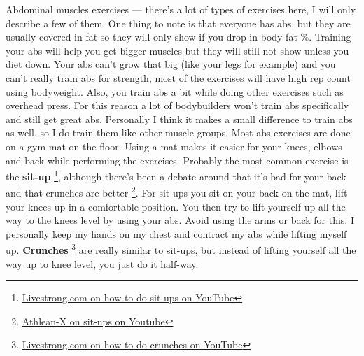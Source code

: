 \documentclass[openany, 12pt]{book}
\begin{document}
        Abdominal muscles exercises
        ---
        there's a lot of types of exercises here, I will only describe a few of them. One thing to note is that everyone has abs, but they are usually covered in fat so they will only show if you drop
        in body fat \%. Training your abs will help you get bigger muscles but they will still not show unless you diet down.
        Your abs can't grow that big (like your legs for example) and you can't really train abs for strength, most of the exercises will have high rep count using bodyweight.
        Also, you train abs a bit while doing other exercises such as overhead press. For this reason a lot of bodybuilders won't train abs specifically and still get great abs.
        Personally I think it makes a small difference to train abs as well, so I do train them like other muscle groups.
        Most abs exercises are done on a gym mat on the floor. Using a mat makes it easier for your knees, elbows and back while performing the exercises.
        Probably the most common exercise is the \textbf{sit-up}
        \footnote{\href{https://www.youtube.com/watch?v=1fbU_MkV7NE}{Livestrong.com on how to do sit-ups on YouTube}}, although there's been a debate around that it's bad for your back and
        that crunches are better
        \footnote{\href{https://www.youtube.com/watch?v=y5BpvYGyVb0}{Athlean-X on sit-ups on Youtube}}. For sit-ups you sit on your back on the mat, lift your knees up in a comfortable position.
        You then try to lift yourself up all the way to the knees level by using your abs. Avoid using the arms or back for this. I personally keep my hands on my chest and contract my abs
        while lifting myself up.
        \textbf{Crunches}
        \footnote{\href{https://www.youtube.com/watch?v=Xyd_fa5zoEU}{Livestrong.com on how to do crunches on YouTube}}
        are really similar to sit-ups, but instead of lifting yourself all the way up to knee level, you just do it half-way.
        
\end{document}
